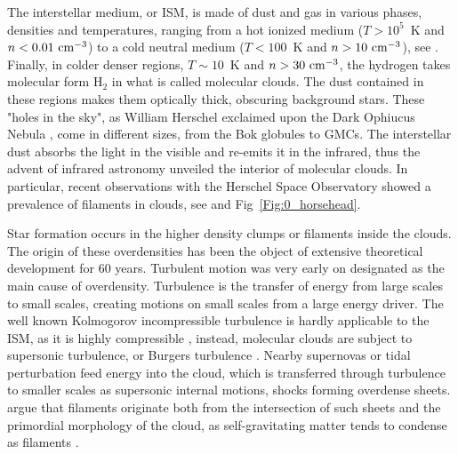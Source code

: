 The interstellar medium, or ISM, is made of dust and gas in various phases, densities and temperatures, ranging from a hot ionized medium ($T>10^5 $~K and $n < 0.01 ~{\textrm{cm}}^{-3}$) to a cold neutral medium ($T<100$~K and $n > 10 ~{\textrm{cm}}^{-3}$),  see \cite{Field1969}. Finally, in colder denser regions, $T\sim 10$~K and $n>30~{\textrm{cm}}^{-3}$, the hydrogen takes molecular form H$_2$ in what is called molecular clouds. The dust contained in these regions makes them optically thick, obscuring background stars. These "holes in the sky", as William Herschel exclaimed upon the Dark Ophiucus Nebula \citep{Houghton1942}, come in different sizes, from the Bok globules to GMCs.
The interstellar dust absorbs the light in the visible and re-emits it in the infrared, thus the advent of infrared astronomy unveiled the interior of molecular clouds. In particular, recent observations with the Herschel Space Observatory showed a prevalence of filaments in clouds, see \cite{Andre2010} and Fig~\ref{Fig:0_horsehead}.

Star formation occurs in the higher density clumps or filaments inside the clouds. The origin of these overdensities has been the object of extensive theoretical development for 60 years. Turbulent motion was very early on designated as the main cause of overdensity. Turbulence is the transfer of energy from large scales to small scales, creating motions on small scales from a large energy driver. The well known Kolmogorov incompressible turbulence is hardly applicable to the ISM, as it is highly compressible \citep{Scalo1998}, instead, molecular clouds are subject to supersonic turbulence, or Burgers turbulence \citep{Frisch2001}. Nearby supernovas or tidal perturbation feed energy into the cloud, which is transferred through turbulence to smaller scales as supersonic internal motions, shocks forming overdense sheets. \cite{McKee2007} argue that filaments originate both from the intersection of such sheets and the primordial morphology of the cloud, as self-gravitating matter tends to condense as filaments \citep{Springel2005}.

